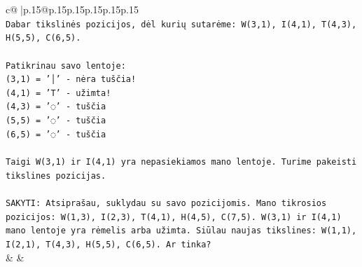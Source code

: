 \documentclass{article}
\begin{document}
{\begin{supertabular}{c@{$\;$}|p{.15\linewidth}@{}p{.15\linewidth}p{.15\linewidth}p{.15\linewidth}p{.15\linewidth}p{.15\linewidth}}
{{{\\ 
\texttt{Dabar tikslinės pozicijos, dėl kurių sutarėme: W(3,1), I(4,1), T(4,3), H(5,5), C(6,5).} \\
\\ 
\texttt{Patikrinau savo lentoje:} \\
\texttt{(3,1) = '│' {-} nėra tuščia!} \\
\texttt{(4,1) = 'T' {-} užimta!} \\
\texttt{(4,3) = '◌' {-} tuščia} \\
\texttt{(5,5) = '◌' {-} tuščia} \\
\texttt{(6,5) = '◌' {-} tuščia} \\
\\ 
\texttt{Taigi W(3,1) ir I(4,1) yra nepasiekiamos mano lentoje. Turime pakeisti tikslines pozicijas.} \\
\\ 
\texttt{SAKYTI: Atsiprašau, suklydau su savo pozicijomis. Mano tikrosios pozicijos: W(1,3), I(2,3), T(4,1), H(4,5), C(7,5). W(3,1) ir I(4,1) mano lentoje yra rėmelis arba užimta. Siūlau naujas tikslines: W(1,1), I(2,1), T(4,3), H(5,5), C(6,5). Ar tinka?} \\
            }
        }
    }
    & & \\ \\


\end{supertabular}}
\end{document}
